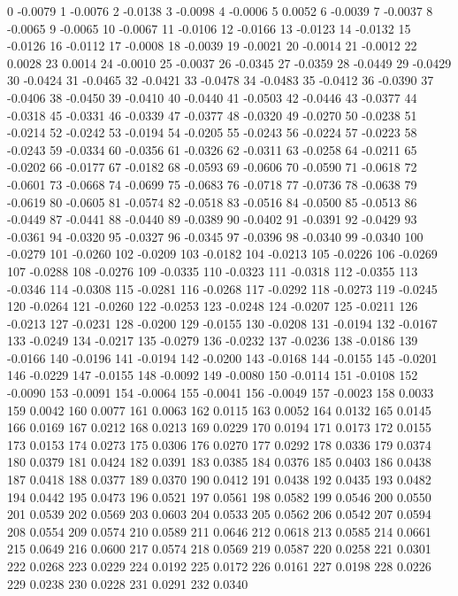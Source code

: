 0 -0.0079
1 -0.0076
2 -0.0138
3 -0.0098
4 -0.0006
5 0.0052
6 -0.0039
7 -0.0037
8 -0.0065
9 -0.0065
10 -0.0067
11 -0.0106
12 -0.0166
13 -0.0123
14 -0.0132
15 -0.0126
16 -0.0112
17 -0.0008
18 -0.0039
19 -0.0021
20 -0.0014
21 -0.0012
22 0.0028
23 0.0014
24 -0.0010
25 -0.0037
26 -0.0345
27 -0.0359
28 -0.0449
29 -0.0429
30 -0.0424
31 -0.0465
32 -0.0421
33 -0.0478
34 -0.0483
35 -0.0412
36 -0.0390
37 -0.0406
38 -0.0450
39 -0.0410
40 -0.0440
41 -0.0503
42 -0.0446
43 -0.0377
44 -0.0318
45 -0.0331
46 -0.0339
47 -0.0377
48 -0.0320
49 -0.0270
50 -0.0238
51 -0.0214
52 -0.0242
53 -0.0194
54 -0.0205
55 -0.0243
56 -0.0224
57 -0.0223
58 -0.0243
59 -0.0334
60 -0.0356
61 -0.0326
62 -0.0311
63 -0.0258
64 -0.0211
65 -0.0202
66 -0.0177
67 -0.0182
68 -0.0593
69 -0.0606
70 -0.0590
71 -0.0618
72 -0.0601
73 -0.0668
74 -0.0699
75 -0.0683
76 -0.0718
77 -0.0736
78 -0.0638
79 -0.0619
80 -0.0605
81 -0.0574
82 -0.0518
83 -0.0516
84 -0.0500
85 -0.0513
86 -0.0449
87 -0.0441
88 -0.0440
89 -0.0389
90 -0.0402
91 -0.0391
92 -0.0429
93 -0.0361
94 -0.0320
95 -0.0327
96 -0.0345
97 -0.0396
98 -0.0340
99 -0.0340
100 -0.0279
101 -0.0260
102 -0.0209
103 -0.0182
104 -0.0213
105 -0.0226
106 -0.0269
107 -0.0288
108 -0.0276
109 -0.0335
110 -0.0323
111 -0.0318
112 -0.0355
113 -0.0346
114 -0.0308
115 -0.0281
116 -0.0268
117 -0.0292
118 -0.0273
119 -0.0245
120 -0.0264
121 -0.0260
122 -0.0253
123 -0.0248
124 -0.0207
125 -0.0211
126 -0.0213
127 -0.0231
128 -0.0200
129 -0.0155
130 -0.0208
131 -0.0194
132 -0.0167
133 -0.0249
134 -0.0217
135 -0.0279
136 -0.0232
137 -0.0236
138 -0.0186
139 -0.0166
140 -0.0196
141 -0.0194
142 -0.0200
143 -0.0168
144 -0.0155
145 -0.0201
146 -0.0229
147 -0.0155
148 -0.0092
149 -0.0080
150 -0.0114
151 -0.0108
152 -0.0090
153 -0.0091
154 -0.0064
155 -0.0041
156 -0.0049
157 -0.0023
158 0.0033
159 0.0042
160 0.0077
161 0.0063
162 0.0115
163 0.0052
164 0.0132
165 0.0145
166 0.0169
167 0.0212
168 0.0213
169 0.0229
170 0.0194
171 0.0173
172 0.0155
173 0.0153
174 0.0273
175 0.0306
176 0.0270
177 0.0292
178 0.0336
179 0.0374
180 0.0379
181 0.0424
182 0.0391
183 0.0385
184 0.0376
185 0.0403
186 0.0438
187 0.0418
188 0.0377
189 0.0370
190 0.0412
191 0.0438
192 0.0435
193 0.0482
194 0.0442
195 0.0473
196 0.0521
197 0.0561
198 0.0582
199 0.0546
200 0.0550
201 0.0539
202 0.0569
203 0.0603
204 0.0533
205 0.0562
206 0.0542
207 0.0594
208 0.0554
209 0.0574
210 0.0589
211 0.0646
212 0.0618
213 0.0585
214 0.0661
215 0.0649
216 0.0600
217 0.0574
218 0.0569
219 0.0587
220 0.0258
221 0.0301
222 0.0268
223 0.0229
224 0.0192
225 0.0172
226 0.0161
227 0.0198
228 0.0226
229 0.0238
230 0.0228
231 0.0291
232 0.0340
